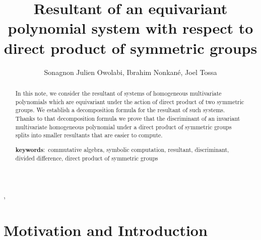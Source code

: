 \documentclass[12pt,a4paper,reqno]{amsart}
\theoremstyle{definition}
\theoremstyle{remark}
\numberwithin{equation}{section}
\begin{document}
\title{Resultant of an equivariant polynomial system with respect to direct product of symmetric groups}

\author{Sonagnon Julien Owolabi, Ibrahim Nonkan\'e, Joel Tossa}

\address{ Institut de Math\'ematiques et de Sciences Physiques, IMSP, Universit\'e d' Abomey-Calavi, B\'enin}
,
\address{D\'epartement d'\'economie et de math\'ematiques appliqu\'ees, IUFIC, Universit\'e Thomas Sankara, Burkina faso}





\maketitle
\begin{abstract}
In this note, we consider the resultant of systems of homogeneous multivariate polynomials which are equivariant under the action of  direct product of two symmetric groups. We establish a decomposition formula for the resultant of such systems. Thanks to that decomposition formula we prove that the discriminant of an invariant multivariate homogeneous polynomial under a direct product of symmetric groups  splits into smaller resultants that are easier to compute.
 
\textbf{keywords}:\ {commutative algebra, symbolic computation, resultant, discriminant, divided difference, direct product of symmetric groups}
\end{abstract}


\section{Motivation and Introduction}
\end{document}
